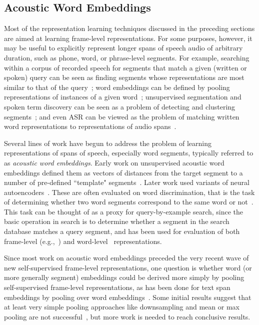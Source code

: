 \subsection{Acoustic Word Embeddings}

Most of the representation learning techniques discussed in the preceding sections are aimed at learning frame-level representations. For some purposes, however, it may be useful to explicitly represent longer spans of speech audio of arbitrary duration, such as phone, word, or phrase-level segments.  For example, searching within a corpus of recorded speech for segments that match a given (written or spoken) query can be seen as finding segments whose representations are most similar to that of the query~\cite{levin_segmental_2015,chen_querybyexample_2015,chung_audio_2016,settle_querybyexample_2017}; word embeddings can be defined by pooling representations of instances of a given word~\cite{chung_speech2vec_2018}; unsupervised segmentation and spoken term discovery can be seen as a problem of detecting and clustering segments~\cite{kamper_embedded_2017,kamper_segmental_2017}; and even ASR can be viewed as the problem of matching written word representations to representations of audio spans~\cite{maas_wordlevel_2012,bengio_word_2014,settle_acoustically_2019}.  

Several lines of work have begun to address the problem of learning representations of spans of speech, especially word segments, typically referred to as \textit{acoustic word embeddings}.  Early work on unsupervised acoustic word embeddings defined them as vectors of distances from the target segment to a number of pre-defined ``template" segments~\cite{levin_fixeddimensional_2013}. Later work used variants of neural autoencoders~\cite{chung_audio_2016,holzenberger_learning_2018,kamper_truly_2019,peng_correspondence_2020}. These are often evaluated on word discrimination, that is the task of determining whether two word segments correspond to the same word or not~\cite{carlin_rapid_2011}. This task can be thought of as a proxy for query-by-example search, since the basic operation in search is to determine whether a segment in the search database matches a query segment, and has been used for evaluation of both frame-level (e.g.,~\cite{kamper_unsupervised_2015}) and word-level~\cite{levin_fixeddimensional_2013,kamper_deep_2016} representations.

Since most work on acoustic word embeddings preceded the very recent wave of new self-supervised frame-level representations, one question is whether word (or more generally segment) embeddings could be derived more simply by pooling self-supervised frame-level representations, as has been done for text span embeddings by pooling over word embeddings~\cite{toshniwal_crosstask_2020,wang_phrasebert_2021}. Some initial results suggest that at least very simple pooling approaches like downsampling and mean or max pooling are not successful~\cite{vanstaden_comparison_2021,peng_correspondence_2020}, but more work is needed to reach conclusive results.
